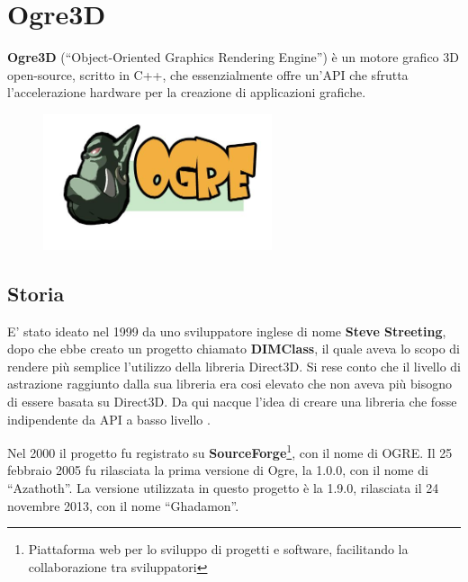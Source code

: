 
\section{Ogre3D}
\textbf{Ogre3D} (“Object-Oriented Graphics Rendering Engine”) è un motore grafico 3D open-source, scritto in C++, che essenzialmente offre un'API che sfrutta l'accelerazione hardware per la creazione di applicazioni grafiche. 

\begin{figure}
\centering
\includegraphics[width=0.6\textwidth]{images/ogre/ogrelogo-small.jpg}

\end{figure}

\subsection{Storia}
E' stato ideato nel 1999 da uno sviluppatore inglese di nome \textbf{Steve Streeting}, dopo che ebbe creato un progetto chiamato \textbf{DIMClass}, il quale aveva lo scopo di rendere più semplice l'utilizzo della libreria Direct3D. Si rese conto che il livello di astrazione raggiunto dalla sua libreria era cosi elevato che non aveva più bisogno di essere basata su Direct3D. Da qui nacque l'idea di creare una libreria che fosse indipendente da API a basso livello \cite{ogre-wiki}.

Nel 2000 il progetto fu registrato su \textbf{SourceForge}\footnote{ Piattaforma web per lo sviluppo di progetti e software, facilitando la collaborazione tra sviluppatori }, con il nome di OGRE. Il 25 febbraio 2005 fu rilasciata la  prima versione di Ogre, la 1.0.0, con il nome di “Azathoth”. La versione utilizzata in questo progetto è la 1.9.0, rilasciata il 24 novembre 2013, con il nome “Ghadamon”.

